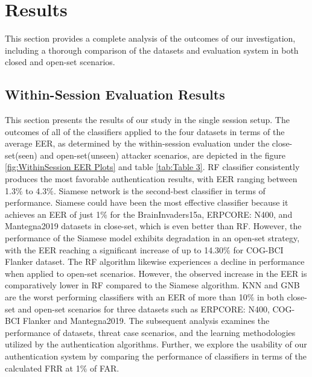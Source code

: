 \section{Results}
\label{sec:Evaluation:Results}
This section provides a complete analysis of the outcomes of our investigation, including a thorough comparison of the datasets and evaluation system in both closed and open-set scenarios. 


\subsection{Within-Session Evaluation Results}
\label{sec:Evaluation:Results:Within-Session Evaluation Results}
This section presents the results of our study in the single session setup. The outcomes of all of the classifiers applied to the four datasets in terms of the average EER, as determined by the within-session evaluation under the close-set(seen) and open-set(unseen) attacker scenarios, are depicted in the figure  \ref{fig:WithinSession EER Plots} and table \ref{tab:Table 3}. RF classifier consistently produces the most favorable authentication results, with EER ranging between 1.3$\%$ to 4.3$\%$. Siamese network is the second-best classifier in terms of performance. Siamese could have been the most effective classifier because it achieves an EER of just 1$\%$ for the BrainInvaders15a, ERPCORE: N400, and Mantegna2019 datasets in close-set, which is even better than RF. However, the performance of the Siamese model exhibits degradation in an open-set strategy, with the EER reaching a significant increase of up to 14.30$\%$ for COG-BCI Flanker dataset. The RF algorithm likewise experiences a decline in performance when applied to open-set scenarios. However, the observed increase in the EER is comparatively lower in RF compared to the Siamese algorithm. KNN and GNB are the worst performing classifiers with an EER of more than 10$\%$ in both close-set and open-set scenarios for three datasets such as ERPCORE: N400, COG-BCI Flanker and Mantegna2019. The subsequent analysis examines the performance of datasets, threat case scenarios, and the learning methodologies utilized by the authentication algorithms. Further, we  explore the usability of our authentication system by comparing the performance of classifiers in terms of the calculated FRR at 1$\%$ of FAR.  
\smallskip

